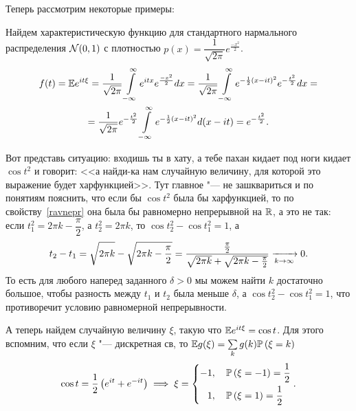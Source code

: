 \documentclass[../TV&MS.tex]{subfiles}
\begin{document}
Теперь рассмотрим некоторые примеры:

\begin{Ex}
    Найдем характеристическую функцию для стандартного нармального распределения $\mathcal{N}(0, 1)$
    с плотностью $p(x) = \dfrac{1}{\sqrt{2\pi}} e^{\frac{-x^2}{2}}$.
    \begin{multline*}
        f(t) = \mathbb{E} e^{it\xi} = 
        \frac{1}{\sqrt{2\pi}}\int\limits_{-\infty}^{\infty} e^{itx} e^{\frac{-x^2}{2}} dx =
        \frac{1}{\sqrt{2\pi}} \int\limits_{-\infty}^{\infty} 
        e^{-\frac{1}{2}(x - it)^2} e^{-\frac{t^2}{2}}dx = \\
        = \frac{1}{\sqrt{2\pi}} e^{-\frac{t^2}{2}} \int\limits_{-\infty}^{\infty}  e^{-\frac{1}{2}(x - it)^2}d(x - it) =
        e^{-\frac{t^2}{2}}
    .\end{multline*}
\end{Ex}

\begin{Ex}
    Вот представь ситуацию: входишь ты в хату, а тебе пахан кидает под ноги
    кидает $\cos t^2$ и говорит: <<а найди-ка нам случайную величину, для 
    которой это выражение будет харфункцией>>. Тут главное "--- не зашквариться
    и по понятиям пояснить, что если бы $\cos t^2$ была бы харфункцией, то по
    свойству~\eqref{ravnepr} она была бы равномерно непрерывной на $\mathbb{R}$,
    а это не так: если $t_1^2 = 2\pi k - \dfrac{\pi}{2}$, а $t_2^2 = 2\pi k$,
    то $\cos t_2^2 - \cos t_1^2 = 1$, а
    \[
        t_2 - t_1 =\sqrt{\vphantom{\frac{\pi}{2}} 2\pi k} - \sqrt{2\pi k - \frac{\pi}{2} } = 
        \frac{\frac{\pi}{2}}{\sqrt{\vphantom{\frac{\pi}{2}} 2\pi k} + \sqrt{2\pi k - \frac{\pi}{2} }}
        \xrightarrow[k \rightarrow \infty]{} 0 
    .\]
    То есть для любого наперед заданного $\delta > 0$ мы можем найти $k$
    достаточно большое, чтобы разность между $t_1$ и $t_2$ была меньше
    $\delta$, а $\cos t_2^2 - \cos t_1^2 = 1$, что противоречит условию 
    равномерной непрерывности.
\end{Ex}

\begin{Ex}
    А теперь найдем случайную величину $\xi$, такую что $\mathbb{E} e^{it\xi} = \cos t$.
    Для этого вспомним, что если $\xi$ "--- дискретная св, то 
    $\mathbb{E} g(\xi) = \sum\limits_{k} g(k) \mathbb{P} \left( \xi = k \right)  $
    \[
        \cos t = \frac{1}{2} \left( e^{it} + e^{-it} \right)
        \implies \xi = 
        \left\{
            \begin{aligned}
                -1 &, \quad \mathbb{P}\left(\xi = -1\right) = \frac{1}{2} \\
                1 &, \quad \mathbb{P} \left( \xi = 1 \right) = \frac{1}{2}
            \end{aligned}
        \right. 
    .\] 
\end{Ex} 

\newpage
\end{document}
